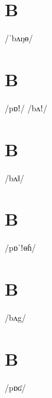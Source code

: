 \documentclass[10pt,a4paper,twoside]{book}
\begin{document}
\section*{B}

\begin{multicols}{3}
 {/ˈbʌŋɵ/} {}
\end{multicols}

\section*{B}

\begin{multicols}{3}
 {/pɒǃ/} {}
 {/bʌǃ/} {}
\end{multicols}

\section*{B}

\begin{multicols}{3}
 {/bʌǁ/} {}
\end{multicols}

\section*{B}

\begin{multicols}{3}
 {/pɒˈǃɵɦ/} {}
\end{multicols}

\section*{B}

\begin{multicols}{3}
 {/bʌg/} {}
\end{multicols}

\section*{B}

\begin{multicols}{3}
 {/pɒʛ/} {}
\end{multicols}
\end{document}
